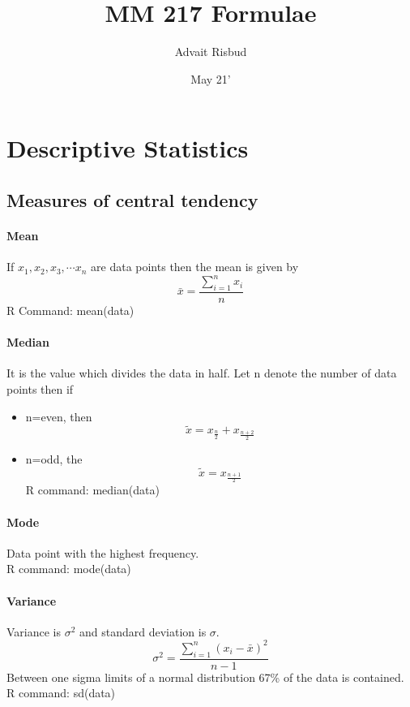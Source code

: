 \documentclass[12pt]{article}
\title{MM 217 Formulae}
\author{{\color{blue}Advait Risbud}}
\date{May 21'}
\begin{document}
	\maketitle
	\tableofcontents
	\pagebreak
	\section{Descriptive Statistics}
	\subsection{Measures of central tendency}
	\paragraph*{Mean} If $ x_1, x_2, x_3,\cdots x_n $ are data points then the mean is given by
	\begin{equation}
		\bar{x}=\dfrac{\sum_{i=1}^{n}x_i}{n}
	\end{equation}
	R Command: {\ttfamily mean(data)}
	\paragraph*{Median} It is the value which divides the data in half. Let n denote the number of data points then if 
	\begin{itemize}
		\item n=even, then 
		\begin{equation}
			\tilde{x}=x_{\frac{n}{2}}+x_{\frac{n+2}{2}}
		\end{equation}
	
	    \item n=odd, the
	    \begin{equation}
	    	\tilde{x}=x_{\frac{n+1}{2}}
	    \end{equation}
	R command: {\ttfamily median(data)}
	\end{itemize}
	\paragraph*{Mode} Data point with the highest frequency. \\
	R command: {\ttfamily mode(data)}
	
	\paragraph*{Variance}
	Variance is $ \sigma^2 $ and standard deviation is $\sigma$.
	\begin{equation}
		\sigma^2=\dfrac{\sum_{i=1}^{n}(x_i-\bar{x})^2}{n-1}
	\end{equation}
	Between one sigma limits of a normal distribution 67\% of the data is contained. \\
	R command: {\ttfamily sd(data)}
\end{document}
